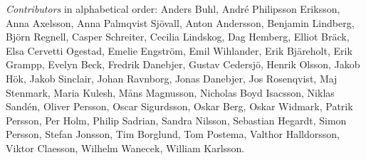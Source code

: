 \emph{Contributors} in alphabetical order:
Anders Buhl,
André Philipsson Eriksson,
Anna Axelsson,
Anna Palmqvist Sjövall,
Anton Andersson,
Benjamin Lindberg,
Björn Regnell,
Casper Schreiter,
Cecilia Lindskog,
Dag Hemberg,
Elliot Bräck,
Elsa Cervetti Ogestad,
Emelie Engström,
Emil Wihlander,
Erik Bjäreholt,
Erik Grampp,
Evelyn Beck,
Fredrik Danebjer,
Gustav Cedersjö,
Henrik Olsson,
Jakob Hök,
Jakob Sinclair,
Johan Ravnborg,
Jonas Danebjer,
Jos Rosenqvist,
Maj Stenmark,
Maria Kulesh,
Måns Magnusson,
Nicholas Boyd Isacsson,
Niklas Sandén,
Oliver Persson,
Oscar Sigurdsson,
Oskar Berg,
Oskar Widmark,
Patrik Persson,
Per Holm,
Philip Sadrian,
Sandra Nilsson,
Sebastian Hegardt,
Simon Persson,
Stefan Jonsson,
Tim Borglund,
Tom Postema,
Valthor Halldorsson,
Viktor Claesson,
Wilhelm Wanecek,
William Karlsson.
